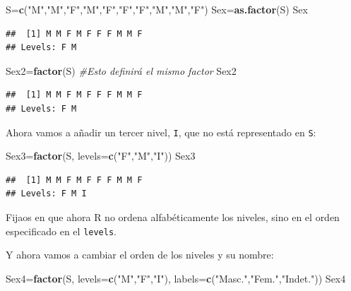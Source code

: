 \documentclass[]{book}
\newenvironment{Shaded}{\begin{snugshade}}{\end{snugshade}}
\newcommand{\CommentTok}[1]{\textcolor[rgb]{0.56,0.35,0.01}{\textit{#1}}}
\newcommand{\DataTypeTok}[1]{\textcolor[rgb]{0.13,0.29,0.53}{#1}}
\newcommand{\KeywordTok}[1]{\textcolor[rgb]{0.13,0.29,0.53}{\textbf{#1}}}
\newcommand{\NormalTok}[1]{#1}
\newcommand{\StringTok}[1]{\textcolor[rgb]{0.31,0.60,0.02}{#1}}
\theoremstyle{definition}
\theoremstyle{definition}
\theoremstyle{definition}
\theoremstyle{remark}
\begin{document}
\begin{Shaded}
\begin{Highlighting}[]
\NormalTok{S=}\KeywordTok{c}\NormalTok{(}\StringTok{"M"}\NormalTok{,}\StringTok{"M"}\NormalTok{,}\StringTok{"F"}\NormalTok{,}\StringTok{"M"}\NormalTok{,}\StringTok{"F"}\NormalTok{,}\StringTok{"F"}\NormalTok{,}\StringTok{"F"}\NormalTok{,}\StringTok{"M"}\NormalTok{,}\StringTok{"M"}\NormalTok{,}\StringTok{"F"}\NormalTok{)}
\NormalTok{Sex=}\KeywordTok{as.factor}\NormalTok{(S)}
\NormalTok{Sex}
\end{Highlighting}
\end{Shaded}

\begin{verbatim}
##  [1] M M F M F F F M M F
## Levels: F M
\end{verbatim}

\begin{Shaded}
\begin{Highlighting}[]
\NormalTok{Sex2=}\KeywordTok{factor}\NormalTok{(S)   }\CommentTok{#Esto definirá el mismo factor}
\NormalTok{Sex2}
\end{Highlighting}
\end{Shaded}

\begin{verbatim}
##  [1] M M F M F F F M M F
## Levels: F M
\end{verbatim}

Ahora vamos a añadir un tercer nivel, \texttt{I}, que no está representado en \texttt{S}:

\begin{Shaded}
\begin{Highlighting}[]
\NormalTok{Sex3=}\KeywordTok{factor}\NormalTok{(S, }\DataTypeTok{levels=}\KeywordTok{c}\NormalTok{(}\StringTok{"F"}\NormalTok{,}\StringTok{"M"}\NormalTok{,}\StringTok{"I"}\NormalTok{))}
\NormalTok{Sex3}
\end{Highlighting}
\end{Shaded}

\begin{verbatim}
##  [1] M M F M F F F M M F
## Levels: F M I
\end{verbatim}

Fijaos en que ahora R no ordena alfabéticamente los niveles, sino en el orden especificado en el \texttt{levels}.

Y ahora vamos a cambiar el orden de los niveles y su nombre:

\begin{Shaded}
\begin{Highlighting}[]
\NormalTok{Sex4=}\KeywordTok{factor}\NormalTok{(S, }\DataTypeTok{levels=}\KeywordTok{c}\NormalTok{(}\StringTok{"M"}\NormalTok{,}\StringTok{"F"}\NormalTok{,}\StringTok{"I"}\NormalTok{), }\DataTypeTok{labels=}\KeywordTok{c}\NormalTok{(}\StringTok{"Masc."}\NormalTok{,}\StringTok{"Fem."}\NormalTok{,}\StringTok{"Indet."}\NormalTok{))}
\NormalTok{Sex4}
\end{Highlighting}
\end{Shaded}
\end{document}
